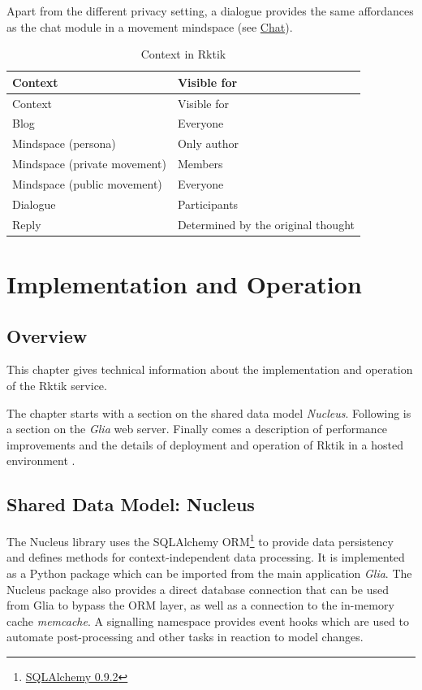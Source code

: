 Apart from the different privacy setting, a dialogue provides the same
affordances as the chat module in a movement mindspace (see
\hyperref[chat]{Chat}).

\begin{longtable}[c]{@{}ll@{}}
\caption{Context in Rktik}\tabularnewline
\toprule
Context & Visible for\tabularnewline
\midrule
\endfirsthead
\toprule
Context & Visible for\tabularnewline
\midrule
\endhead
Blog & Everyone\tabularnewline
Mindspace (persona) & Only author\tabularnewline
Mindspace (private movement) & Members\tabularnewline
Mindspace (public movement) & Everyone\tabularnewline
Dialogue & Participants\tabularnewline
Reply & Determined by the original thought\tabularnewline
\bottomrule
\end{longtable}

\chapter{Implementation and
Operation}\label{implementation-and-operation}

\section{Overview}\label{overview-1}

This chapter gives technical information about the implementation and
operation of the Rktik service.

The chapter starts with a section on the shared data model
\emph{Nucleus}. Following is a section on the \emph{Glia} web server.
Finally comes a description of performance improvements and the details
of deployment and operation of Rktik in a hosted environment .

\section{Shared Data Model: Nucleus}\label{shared-data-model-nucleus}

The Nucleus library uses the SQLAlchemy ORM\footnote{\href{https://pypi.python.org/pypi/SQLAlchemy/0.9.2}{SQLAlchemy
  0.9.2}} to provide data persistency and defines methods for
context-independent data processing. It is implemented as a Python
package which can be imported from the main application \emph{Glia}. The
Nucleus package also provides a direct database connection that can be
used from Glia to bypass the ORM layer, as well as a connection to the
in-memory cache \emph{memcache}. A signalling namespace provides event
hooks which are used to automate post-processing and other tasks in
reaction to model changes.

